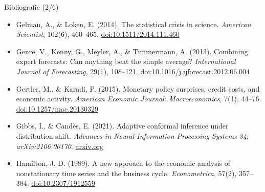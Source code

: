 \begin{frame}{Bibliografie (2/6)}
\begin{itemize}
    \item Gelman, A., \& Loken, E. (2014). The statistical crisis in science. \textit{American Scientist}, 102(6), 460--465. \href{https://doi.org/10.1511/2014.111.460}{doi:10.1511/2014.111.460}
    \item Genre, V., Kenny, G., Meyler, A., \& Timmermann, A. (2013). Combining expert forecasts: Can anything beat the simple average? \textit{International Journal of Forecasting}, 29(1), 108--121. \href{https://doi.org/10.1016/j.ijforecast.2012.06.004}{doi:10.1016/j.ijforecast.2012.06.004}
    \item Gertler, M., \& Karadi, P. (2015). Monetary policy surprises, credit costs, and economic activity. \textit{American Economic Journal: Macroeconomics}, 7(1), 44--76. \href{https://doi.org/10.1257/mac.20130329}{doi:10.1257/mac.20130329}
    \item Gibbs, I., \& Candès, E. (2021). Adaptive conformal inference under distribution shift. \textit{Advances in Neural Information Processing Systems 34}; \textit{arXiv:2106.00170}. \href{https://arxiv.org/abs/2106.00170}{arxiv.org}
    \item Hamilton, J. D. (1989). A new approach to the economic analysis of nonstationary time series and the business cycle. \textit{Econometrica}, 57(2), 357--384. \href{https://doi.org/10.2307/1912559}{doi:10.2307/1912559}
\end{itemize}
\end{frame}

